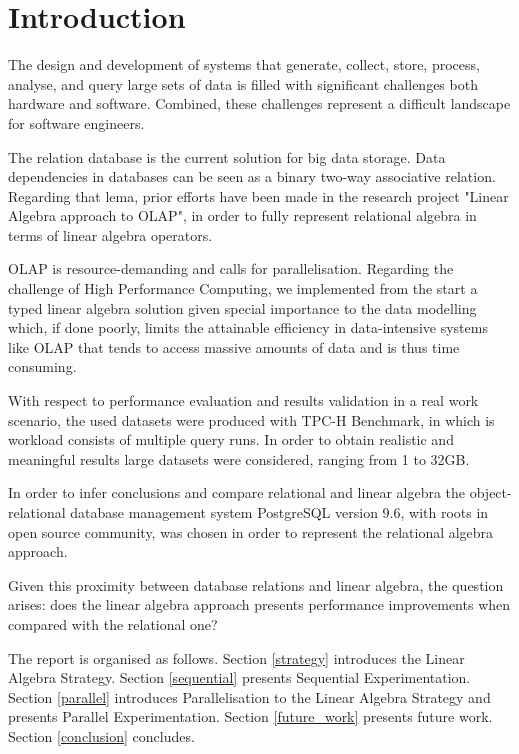 
\section{Introduction}
\indent

The design and development of systems that generate, collect, store, process, analyse, and query large sets of data is filled with significant challenges both hardware and software. Combined, these challenges represent a difficult landscape for software engineers.\par 
The relation database is the current solution for big data storage.
Data dependencies in databases can be seen as a binary two-way associative relation. Regarding that lema, 
prior efforts have been made \cite{macedo2015linear} \cite{da2015benchmarking} in the research project "Linear Algebra approach to OLAP", in order to fully represent relational algebra in terms of linear algebra operators.
\par 

OLAP is resource-demanding and calls for parallelisation. Regarding the challenge of High Performance Computing, we implemented from the start a typed linear algebra solution given special importance to the data modelling which, if done poorly, limits the attainable efficiency in data-intensive systems like OLAP that tends to access massive amounts of data and is thus time consuming. \par 
With respect to performance evaluation and results validation in a real work scenario, the used datasets were produced with TPC-H Benchmark, in which is workload consists of multiple query runs.
In order to obtain realistic and meaningful results large datasets were considered, ranging from 1 to 32GB.\par 
In order to infer conclusions and compare relational and linear algebra the object-relational database management system PostgreSQL version 9.6, with roots in open source community, was chosen in order to represent the relational algebra approach. \par 
Given this proximity between database relations and linear algebra, the question arises: does the linear algebra approach presents performance improvements when compared with the relational one?\par 
The report is organised as follows. 
Section \ref{strategy} introduces the Linear Algebra Strategy. 
Section \ref{sequential} presents Sequential Experimentation. 
Section \ref{parallel} introduces Parallelisation to the Linear Algebra Strategy and presents  Parallel Experimentation. 
Section \ref{future_work} presents future work.
 Section  \ref{conclusion} concludes.